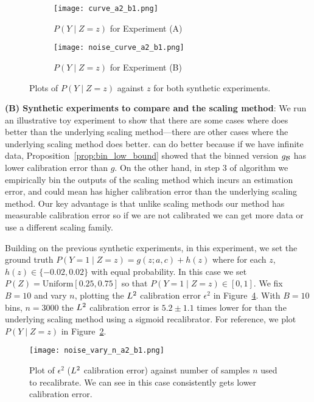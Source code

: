 \begin{figure}
  \centering
  \centering
     \begin{subfigure}[b]{0.48\textwidth}
         \centering
         \texttt{[image: curve\_a2\_b1.png]}
         \caption{$P(Y \mid Z=z)$ for Experiment (A)
         }
         \label{fig:well-spec-curve}
     \end{subfigure}
     \hfill
     \begin{subfigure}[b]{0.48\textwidth}
         \centering
         \texttt{[image: noise\_curve\_a2\_b1.png]}
         \caption{$P(Y \mid Z=z)$ for Experiment (B)
         }
         \label{fig:noisy-spec-curve}
     \end{subfigure}
  \caption{
    Plots of $P(Y \mid Z=z)$ against $z$ for both synthetic experiments.
}
  \label{fig:p_y_z_plots}
\end{figure}


\textbf{(B) Synthetic experiments to compare \ourcal{} and the scaling method}: We run an illustrative toy experiment to show that there are some cases where \ourcal{} does better than the underlying scaling method---there are other cases where the underlying scaling method does better. \ourcal{} can do better because if we have infinite data, Proposition~\ref{prop:bin_low_bound} showed that the binned version $g_{\mathcal{B}{}}$ has lower calibration error than $g$. On the other hand, in step 3 of \ourcal{} algorithm we empirically bin the outputs of the scaling method which incurs an estimation error, and could mean \ourcal{} has higher calibration error than the underlying scaling method. Our key advantage is that unlike scaling methods our method has measurable calibration error so if we are not calibrated we can get more data or use a different scaling family.

Building on the previous synthetic experiments, in this experiment, we set the ground truth $P(Y = 1 \mid Z=z) = g(z; a, c) + h(z)$ where for each $z$, $h(z) \in \{-0.02, 0.02\}$ with equal probability. In this case we set $P(Z) = \mbox{Uniform}[0.25, 0.75]$ so that $P(Y = 1 \mid Z=z) \in [0, 1]$. We fix $B=10$ and vary $n$, plotting the $L^2$ calibration error $\epsilon^2$ in Figure~\ref{fig:well-spec-vary-b}. With $B=10$ bins, $n = 3000$ the $L^2$ calibration error is $5.2 \pm 1.1$ times lower for \ourcal{} than the underlying scaling method using a sigmoid recalibrator. For reference, we plot $P(Y \mid Z = z)$ in Figure~\ref{fig:noisy-spec-curve}.

\begin{figure}
  \centering
  \texttt{[image: noise\_vary\_n\_a2\_b1.png]}
  \caption{Plot of $\epsilon^2$ ($L^2$ calibration error) against number of samples $n$ used to recalibrate. We can see in this case \ourcal{} consistently gets lower calibration error.
  }
  \label{fig:well-spec-vary-b}
\end{figure}
